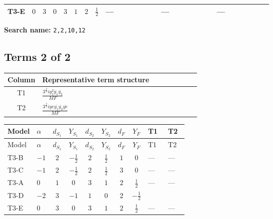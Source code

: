 \documentclass[8pt]{article}
\begin{document}
\begin{landscape}
\begin{longtable}{@{}llcccccc >{\raggedright\arraybackslash}p{0.21\linewidth} >{\raggedright\arraybackslash}p{0.21\linewidth} >{\raggedright\arraybackslash}p{0.21\linewidth}@{}}
\midrule
T3-E & $0$ & $3$ & $0$ & $3$ & $1$ & $2$ & $\frac{1}{2}$ & --- & --- & --- \\
\midrule
\bottomrule
\end{longtable}
\clearpage
\noindent\textbf{Search name: }\texttt{2,2,10,12}\par\smallskip
\subsection*{Terms 2 of 2}
\begin{center}
\begin{tabular}{@{}c >{\raggedright\arraybackslash}p{0.82\linewidth}@{}}
\toprule
Column & Representative term structure \\
\midrule
T1 & \(\displaystyle \frac{3^{\frac{3}{4}} i g_{1}^{2} \overline{y_{1}} \overline{y_{2}}}{MF}\) \\
\midrule
T2 & \(\displaystyle \frac{3^{\frac{3}{4}} i ye \overline{y_{1}} \overline{y_{2}} \overline{ye}}{MF}\) \\
\midrule
\bottomrule
\end{tabular}
\end{center}
\smallskip
\tiny
\begin{longtable}{@{}llcccccc >{\raggedright\arraybackslash}p{0.21\linewidth} >{\raggedright\arraybackslash}p{0.21\linewidth}@{}}
\toprule
Model & $\alpha$ & $d_{S_1}$ & $Y_{S_1}$ & $d_{S_2}$ & $Y_{S_2}$ & $d_F$ & $Y_F$ & T1 & T2 \\
\midrule
\endfirsthead
\toprule
Model & $\alpha$ & $d_{S_1}$ & $Y_{S_1}$ & $d_{S_2}$ & $Y_{S_2}$ & $d_F$ & $Y_F$ & T1 & T2 \\
\midrule
\endhead
T3-B & $-1$ & $2$ & $-\frac{1}{2}$ & $2$ & $\frac{1}{2}$ & $1$ & $0$ & --- & --- \\
\midrule
T3-C & $-1$ & $2$ & $-\frac{1}{2}$ & $2$ & $\frac{1}{2}$ & $3$ & $0$ & --- & --- \\
\midrule
T3-A & $0$ & $1$ & $0$ & $3$ & $1$ & $2$ & $\frac{1}{2}$ & --- & --- \\
\midrule
T3-D & $-2$ & $3$ & $-1$ & $1$ & $0$ & $2$ & $-\frac{1}{2}$ & \scriptsize\adjustbox{max width=\linewidth}{$\begin{gathered} - \frac{3^{\frac{3}{4}} i g_{1}^{2} \overline{y_{1}} \overline{y_{2}}}{8 MF}\end{gathered}$} & \scriptsize\adjustbox{max width=\linewidth}{$\begin{gathered} \frac{3^{\frac{3}{4}} i ye \overline{y_{1}} \overline{y_{2}} \overline{ye}}{12 MF}\end{gathered}$} \\
\midrule
T3-E & $0$ & $3$ & $0$ & $3$ & $1$ & $2$ & $\frac{1}{2}$ & --- & --- \\
\midrule
\bottomrule
\end{longtable}
\clearpage

\end{landscape}
\end{document}
